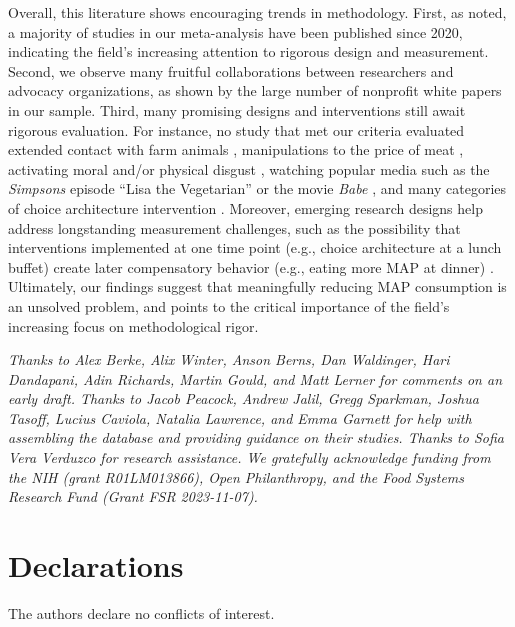 \documentclass[sn-nature,referee,pdflatex]{sn-jnl}
\begin{document}
Overall, this literature shows encouraging trends in methodology. First,
as noted, a majority of studies in our meta-analysis have been published
since 2020, indicating the field's increasing attention to rigorous
design and measurement. Second, we observe many fruitful collaborations
between researchers and advocacy organizations, as shown by the large
number of nonprofit white papers in our sample. Third, many promising
designs and interventions still await rigorous evaluation. For instance,
no study that met our criteria evaluated extended contact with farm
animals \citep{cerrato2022}, manipulations to the price of meat
\citep{wilde2016}, activating moral and/or physical disgust
\citep{palomo2018}, watching popular media such as the \emph{Simpsons}
episode ``Lisa the Vegetarian'' \citep{byrd2010} or the movie
\emph{Babe} \citep{novatna2019}, and many categories of choice
architecture intervention \citep{olafsson2024}. Moreover, emerging
research designs help address longstanding measurement challenges, such
as the possibility that interventions implemented at one time point
(e.g., choice architecture at a lunch buffet) create later compensatory
behavior (e.g., eating more MAP at dinner) \citep{vocski2024}.
Ultimately, our findings suggest that meaningfully reducing MAP
consumption is an unsolved problem, and points to the critical
importance of the field's increasing focus on methodological rigor.


\emph{Thanks to Alex Berke, Alix Winter, Anson Berns, Dan Waldinger,
Hari Dandapani, Adin Richards, Martin Gould, and Matt Lerner for
comments on an early draft. Thanks to Jacob Peacock, Andrew Jalil, Gregg
Sparkman, Joshua Tasoff, Lucius Caviola, Natalia Lawrence, and Emma
Garnett for help with assembling the database and providing guidance on
their studies. Thanks to Sofia Vera Verduzco for research assistance. We
gratefully acknowledge funding from the NIH (grant R01LM013866), Open
Philanthropy, and the Food Systems Research Fund (Grant FSR
2023-11-07).}

\section*{Declarations}\label{declarations}

The authors declare no conflicts of interest. \newpage

\renewcommand\refname{References}

\end{document}
